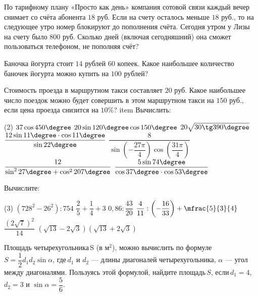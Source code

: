 \begin{homework}[number=2]
	\begin{listofex}
		\item По тарифному плану «Просто как день» компания сотовой связи каждый вечер снимает со счёта абонента \( 18 \) руб. Если на счету осталось меньше \( 18 \) руб., то на следующее утро номер блокируют до пополнения счёта. Сегодня утром у Лизы на счету было \( 800 \) руб. Сколько дней (включая сегодняшний) она сможет пользоваться телефоном, не пополняя счёт?
		\item Баночка йогурта стоит \( 14 \) рублей \( 60 \) копеек. Какое наибольшее количество баночек йогурта можно купить на \( 100 \) рублей?
		\item Стоимость проезда в маршрутном такси составляет \( 20 \) руб. Какое наибольшее число поездок можно будет совершить в этом маршрутном такси на \( 150 \) руб., если цена проезда снизится на \( 10\% \)?
		item Вычислить:
		\begin{tasks}(2)
			\task \( 37\cos450\degree \)
			\task \( 20\sin120\degree\cos150\degree \)
			\task \( 20\sqrt{30\tg390\degree} \)
			\task \( \dfrac{12\sin11\degree\cdot\cos11\degree}{\sin22\degree} \)
			\task \( \dfrac{8}{\sin\left( -\dfrac{27\pi}{4} \right)\cos\left( \dfrac{31\pi}{4} \right)} \)
			\task \( \dfrac{12}{\sin^227\degree+\cos^2207\degree} \)
			\task \( \dfrac{5\sin74\degree}{\cos37\degree\cdot\cos53\degree} \)
		\end{tasks}
		\item Вычислите:
		\begin{tasks}(3)
			\task \( (728^2-26^2):754\)
			\task \( \dfrac{2}{5}+\dfrac{1}{4}+3 \)
			\task \( 0,86:\dfrac{43}{20} \)
			\task \( \dfrac{4}{11}:\left( -\dfrac{16}{33} \right)+\mfrac{5}{3}{4} \)
			\task \( \dfrac{(2\sqrt{7})^2}{14} \)
			\task \( (\sqrt{13}-2\sqrt{3})(\sqrt{13}+2\sqrt{3}) \)
		\end{tasks}
		\item Площадь четырехугольника S (в м\( ^2 \)), можно вычислить по формуле \( S=\dfrac{1}{2}d_1d_2\sin\alpha \),  где \( d_1 \) и \( d_2 \) --- длины диагоналей четырехугольника, \( \alpha \) --- угол между диагоналями. Пользуясь этой формулой, найдите площадь \( S \), если \( d_1=4 \), \( d_2=3  \) и \( \sin\alpha=\dfrac{5}{6} \).
	\end{listofex}
\end{homework}
%
